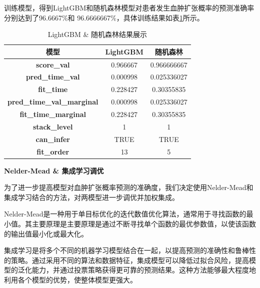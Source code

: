 \documentclass[bwprint]{gmcmthesis}
\begin{document}
训练模型，得到LightGBM和随机森林模型对患者发生血肿扩张概率的预测准确率分别达到了96.6667\%和 96.6666667\%，具体训练结果如表\ref{tab:3}所示。\\
\begin{table}[ht]
\centering
\caption{LightGBM \& 随机森林结果展示}
\label{tab:3}
\fontsize{11}{9}\selectfont
\renewcommand\tabcolsep{6pt}
{
\begin{tabular}{ccc}
\toprule[1.2pt]
\textbf{模型}                        & LightGBM & 随机森林 \\ \hline
\textbf{score\_val}                & 0.966667      & 0.966666667      \\
\textbf{pred\_time\_val}           & 0.000998      & 0.025336027      \\
\textbf{fit\_time}                 & 0.228427      & 0.30355835       \\
\textbf{pred\_time\_val\_marginal} & 0.000998      & 0.025336027      \\
\textbf{fit\_time\_marginal}       & 0.228427      & 0.30355835       \\
\textbf{stack\_level}              & 1             & 1                \\
\textbf{can\_infer}                & TRUE          & TRUE             \\
\textbf{fit\_order}                & 13            & 5                \\  \bottomrule[1.2pt]
\end{tabular}}
\end{table}

{\textbf{Nelder-Mead \& 集成学习调优}}\par
为了进一步提高模型对血肿扩张概率预测的准确度，我们决定使用Nelder-Mead和集成学习结合的方法，对两模型进一步调优并加权集成。

Nelder-Mead是一种用于单目标优化的迭代数值优化算法，通常用于寻找函数的最小值。其主要原理是主要原理是通过不断寻找单个函数的最优参数值，以使该函数的输出值最小化或最大化。

集成学习是将多个不同的机器学习模型结合在一起，以提高预测的准确性和鲁棒性的策略。通过采用不同的算法和数据特征，集成模型可以降低过拟合风险，提高模型的泛化能力，并通过投票策略获得更可靠的预测结果。这种方法能够最大程度地利用各个模型的优势，使整体模型更强大。
\end{document}
